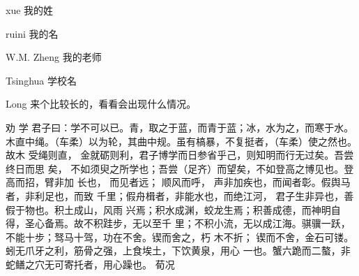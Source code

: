 \begin{denotation}
	\renewcommand{\currentchapter}{主要符号对照表}
	\thispagestyle{plain}
	\fancyfoot[C]{\thepage}
\item[xue] 我的姓
\item[ruini] 我的名
\item[W.M. Zheng]  我的老师
\item[Tsinghua] 学校名
\item[Long] 来个比较长的，看看会出现什么情况。
\item[劝  学] 君子曰：学不可以已。青，取之于蓝，而青于蓝；冰，水为之，而寒于水。
  木直中绳。（车柔）以为轮，其曲中规。虽有槁暴，不复挺者，（车柔）使之然也。故木
  受绳则直， 金就砺则利，君子博学而日参省乎己，则知明而行无过矣。吾尝终日而思
  矣，  不如须臾之所学也；吾尝（足齐）而望矣，不如登高之博见也。登高而招，臂非加
  长也，  而见者远；  顺风而呼，  声非加疾也，而闻者彰。假舆马者，非利足也，而致
  千里；假舟楫者，非能水也，而绝江河，  君子生非异也，善假于物也。积土成山，风雨
  兴焉；积水成渊，蛟龙生焉；积善成德，而神明自得，圣心备焉。故不积跬步，无以至千
  里；不积小流，无以成江海。骐骥一跃，不能十步；驽马十驾，功在不舍。锲而舍之，朽
  木不折；  锲而不舍，金石可镂。蚓无爪牙之利，筋骨之强，上食埃土，下饮黄泉，用心
  一也。蟹六跪而二螯，非蛇鳝之穴无可寄托者，用心躁也。\pozhehao{} 荀况
\end{denotation}
